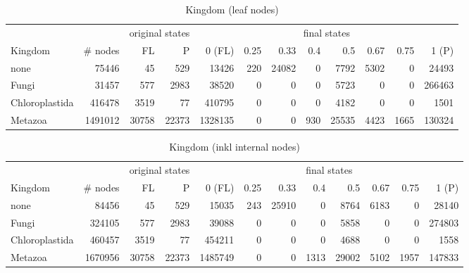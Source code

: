      \begin{table}[h!]
        \begin{center}
          \hspace*{-2cm}\begin{tabular}{ |l|r||r|r||r|r|r|r|r|r|r|r| }
            \hline
            & & \multicolumn{2}{c||}{original states} & \multicolumn{8}{c|}{final states} \\
            Kingdom & \# nodes & FL & P
              & 0 (FL) & 0.25 & 0.33 & 0.4 & 0.5 & 0.67 & 0.75 & 1 (P) \\
            \hline \hline
            none & 75446 & 45 & 529 
              & 13426 & 220 & 24082 & 0 & 7792 & 5302 & 0 & 24493 \\
            Fungi & 31457 & 577 & 2983
              & 38520 & 0 & 0 & 0 & 5723 & 0 & 0 & 266463 \\
            Chloroplastida & 416478 & 3519 & 77
              & 410795 & 0 & 0 & 0 & 4182 & 0 & 0 & 1501 \\
            Metazoa & 1491012 & 30758 & 22373
              & 1328135 & 0 & 0 & 930 & 25535 & 4423 & 1665 & 130324 \\
            \hline  
          \end{tabular}
        \end{center}
        \caption{Kingdom (leaf nodes)}
        \label{table:Kingdom leaf nodes}
      \end{table}

      \begin{table}[h!]
        \begin{center}
          \hspace*{-2cm}\begin{tabular}{ |l|r||r|r||r|r|r|r|r|r|r|r| }
            \hline
            & & \multicolumn{2}{c||}{original states} & \multicolumn{8}{c|}{final states} \\
            Kingdom & \# nodes & FL & P
              & 0 (FL) & 0.25 & 0.33 & 0.4 & 0.5 & 0.67 & 0.75 & 1 (P) \\
            \hline \hline
            none & 84456 & 45 & 529 
              & 15035 & 243 & 25910 & 0 & 8764 & 6183 & 0 & 28140 \\
            Fungi & 324105 & 577 & 2983
              & 39088 & 0 & 0 & 0 & 5858 & 0 & 0 & 274803 \\
            Chloroplastida & 460457 & 3519 & 77
              & 454211 & 0 & 0 & 0 & 4688 & 0 & 0 & 1558 \\
            Metazoa & 1670956 & 30758 & 22373
              & 1485749 & 0 & 0 & 1313 & 29002 & 5102 & 1957 & 147833 \\
            \hline  
          \end{tabular}
        \end{center}
        \caption{Kingdom (inkl internal nodes)}
        \label{table:Kingdom internal nodes}
      \end{table}


